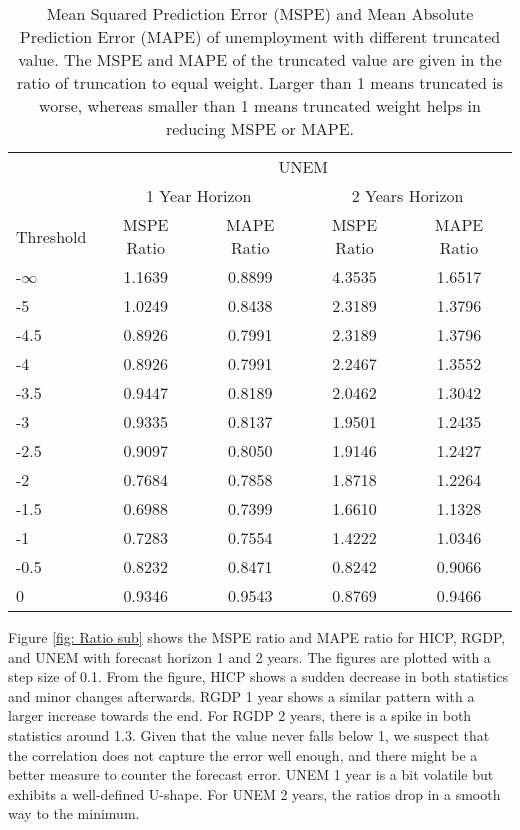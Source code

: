 \documentclass[11pt]{article}
\begin{document}
\begin{table}[!h] 
\centering
\caption{Mean Squared Prediction Error (MSPE) and Mean Absolute Prediction Error (MAPE) of unemployment with different truncated value. The MSPE and MAPE of the truncated value are given in the ratio of truncation to equal weight. Larger than 1 means truncated is worse, whereas smaller than 1 means truncated weight helps in reducing MSPE or MAPE.}
\label{tab: MSPE UNEM}
\begin{tabular}{lcccc}
\hline
& \multicolumn{4}{c}{UNEM}                                                \\
\cmidrule(lr){2-5}
& \multicolumn{2}{c}{1 Year Horizon} & \multicolumn{2}{c}{2 Years Horizon} \\
\cmidrule(lr){2-3} \cmidrule(lr){4-5}
Threshold & MSPE Ratio &    MAPE Ratio    & MSPE Ratio &    MAPE Ratio    \\ \hline
\hline
-$\infty$ & 1.1639 & 0.8899 & 4.3535 & 1.6517\\ 
-5 & 1.0249 & 0.8438 & 2.3189 & 1.3796\\ 
-4.5 & 0.8926 & 0.7991 & 2.3189 & 1.3796\\ 
-4 & 0.8926 & 0.7991 & 2.2467 & 1.3552\\ 
-3.5 & 0.9447 & 0.8189 & 2.0462 & 1.3042\\ 
-3 & 0.9335 & 0.8137 & 1.9501 & 1.2435\\ 
-2.5 & 0.9097 & 0.8050 & 1.9146 & 1.2427\\ 
-2 & 0.7684 & 0.7858 & 1.8718 & 1.2264\\ 
-1.5 & 0.6988 & 0.7399 & 1.6610 & 1.1328\\ 
-1 & 0.7283 & 0.7554 & 1.4222 & 1.0346\\ 
-0.5 & 0.8232 & 0.8471 & 0.8242 & 0.9066\\ 
0 & 0.9346 & 0.9543 & 0.8769 & 0.9466\\ \hline
\end{tabular}
\end{table}



Figure \ref{fig: Ratio sub} shows the MSPE ratio and MAPE ratio for HICP, RGDP, and UNEM with forecast horizon 1 and 2 years. The figures are plotted with a step size of 0.1. From the figure, HICP shows a sudden decrease in both statistics and minor changes afterwards. RGDP 1 year shows a similar pattern with a larger increase towards the end. For RGDP 2 years, there is a spike in both statistics around 1.3. Given that the value never falls below 1, we suspect that the correlation does not capture the error well enough, and there might be a better measure to counter the forecast error. UNEM 1 year is a bit volatile but exhibits a well-defined U-shape. For UNEM 2 years, the ratios drop in a smooth way to the minimum.
\end{document}

